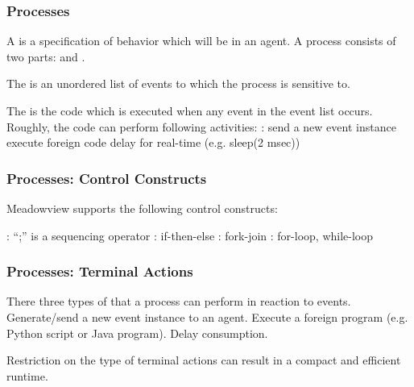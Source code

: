\documentclass{beamer}
\begin{document}
\begin{frame}
\frametitle{Processes}

A  is a specification of behavior which will be  in
an agent. 
A process consists of two parts:  and . 

\vspace*{0.4cm}

The  is an unordered list of events to which the process is
sensitive to.

\vspace*{0.4cm}

The  is the code which is executed when any event in the
event list occurs. Roughly, the code can perform following activities:
\bit
\w {}
\w {}
\w {}
\w {}: 
   \bit
   \w send a new event instance
   \w execute foreign code
   \w delay for real-time (e.g. sleep(2 msec))
   \eit
\eit

\end{frame}

\begin{frame}
\frametitle{Processes: Control Constructs}

Meadowview supports the following control constructs:

\bit
\w {}: ``;'' is a sequencing operator
\w {}: if-then-else
\w {}: fork-join
\w {}: for-loop, while-loop
\eit

\end{frame}

\begin{frame}
\frametitle{Processes: Terminal Actions}

There three types of  that a process can perform in
reaction to events.  
\bit
\w Generate/send a new event instance to an agent.
\w Execute a foreign program (e.g. Python script or Java program). 
\w Delay consumption.
\eit

\vspace*{0.4cm}

Restriction on the type of terminal actions can result in a compact and
efficient runtime.
\end{frame}
\end{document}
